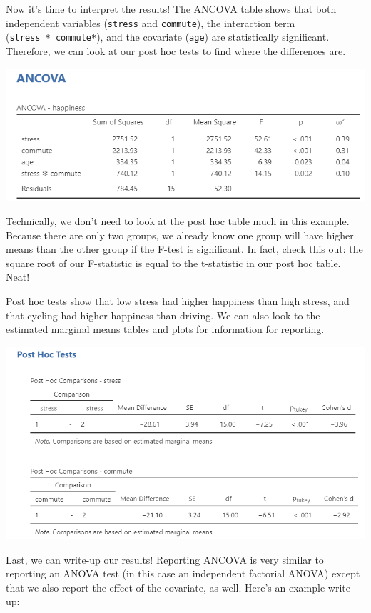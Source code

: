 \documentclass[
]{book}
\begin{document}
Now it's time to interpret the results! The ANCOVA table shows that both independent variables (\texttt{stress} and \texttt{commute}), the interaction term (\texttt{stress\ *\ commute*}), and the covariate (\texttt{age}) are statistically significant. Therefore, we can look at our post hoc tests to find where the differences are.

\includegraphics{images/07-ancova/ancova_results.png}

Technically, we don't need to look at the post hoc table much in this example. Because there are only two groups, we already know one group will have higher means than the other group if the F-test is significant. In fact, check this out: the square root of our F-statistic is equal to the t-statistic in our post hoc table. Neat!

Post hoc tests show that low stress had higher happiness than high stress, and that cycling had higher happiness than driving. We can also look to the estimated marginal means tables and plots for information for reporting.

\includegraphics{images/07-ancova/ancova_tukey.png}

Last, we can write-up our results! Reporting ANCOVA is very similar to reporting an ANOVA test (in this case an independent factorial ANOVA) except that we also report the effect of the covariate, as well. Here's an example write-up:
\end{document}
